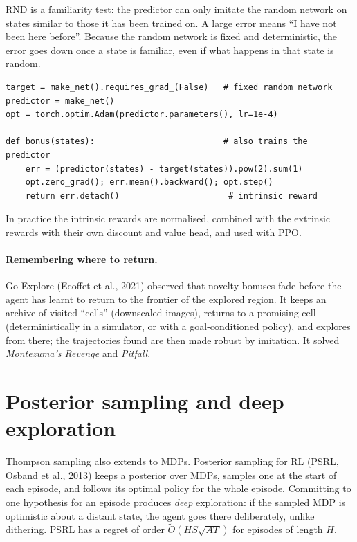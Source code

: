 \begin{intuition}
  RND is a familiarity test: the predictor can only imitate the random
  network on states similar to those it has been trained on. A large error
  means ``I have not been here before''. Because the random network is
  fixed and deterministic, the error goes down once a state is familiar,
  even if what happens in that state is random.
\end{intuition}

\begin{lstlisting}[caption={Random network distillation bonus (PyTorch)}]
target = make_net().requires_grad_(False)   # fixed random network
predictor = make_net()
opt = torch.optim.Adam(predictor.parameters(), lr=1e-4)

def bonus(states):                          # also trains the predictor
    err = (predictor(states) - target(states)).pow(2).sum(1)
    opt.zero_grad(); err.mean().backward(); opt.step()
    return err.detach()                      # intrinsic reward
\end{lstlisting}

In practice the intrinsic rewards are normalised, combined with the
extrinsic rewards with their own discount and value head, and used with
PPO.

\paragraph{Remembering where to return.} Go-Explore (Ecoffet et al.,
2021) observed that novelty bonuses fade before the agent has learnt to
return to the frontier of the explored region. It keeps an archive of
visited ``cells'' (downscaled images), returns to a promising cell
(deterministically in a simulator, or with a goal-conditioned policy), and
explores from there; the trajectories found are then made robust by
imitation. It solved \emph{Montezuma's Revenge} and \emph{Pitfall}.

\section{Posterior sampling and deep exploration}

Thompson sampling also extends to MDPs. Posterior sampling for RL (PSRL,
Osband et al., 2013) keeps a posterior over MDPs, samples one at the start
of each episode, and follows its optimal policy for the whole episode.
Committing to one hypothesis for an episode produces \emph{deep}
exploration: if the sampled MDP is optimistic about a distant state, the
agent goes there deliberately, unlike dithering. PSRL has a regret of
order $\tilde O(H S \sqrt{A T})$ for episodes of length $H$.

